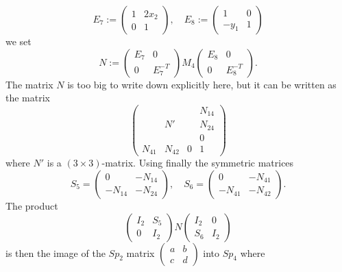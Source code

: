 \documentclass[11pt,leqno]{article}
\newcommand{\jean}[1]{\textcolor{blue}{#1}} %
\renewcommand{\1}{{\rm 1\hspace*{-0.4ex}%
\rule{0.1ex}{1.52ex}\hspace*{0.2ex}}}
\newcommand{\<}[1]{{\langle}#1 {\rangle}}
\theoremstyle{plain}
\theoremstyle{definition}
\theoremstyle{remark}
\numberwithin{equation}{section}
\begin{document}
\begin{equation*}
    E_7 := \begin{pmatrix}
        1  & 2x_2 \\ 0 & 1 
    \end{pmatrix}, \quad E_8 := \begin{pmatrix}
        1 & 0 \\ -y_1 & 1
    \end{pmatrix}
\end{equation*}
we set 
\begin{equation*}
    N := \begin{pmatrix}
        E_7 & 0 \\ 0 & E_7^{-T}
    \end{pmatrix}
    M_4\begin{pmatrix}
        E_8& 0 \\ 0 & E_8^{-T}
    \end{pmatrix} .
\end{equation*}
The matrix $N$ is too big to write down explicitly here, but it can be written as the matrix
\begin{equation*}
    \begin{pmatrix}
        & & & N_{14} \\
        & N'& & N_{24} \\
        & & & 0 \\
        N_{41} & N_{42} & 0 & 1
    \end{pmatrix}
\end{equation*}
where $N'$ is a $(3 \times 3)$-matrix. 
Using finally the symmetric matrices 
\begin{equation*}
    S_5 = \begin{pmatrix}
        0 & -N_{14} \\ -  N_{14} & -N_{24}
    \end{pmatrix},\quad S_6 = \begin{pmatrix}
        0 & -N_{41} \\ -  N_{41} & -N_{42}
    \end{pmatrix} .
\end{equation*} 
The product 
\begin{equation*}
    \begin{pmatrix}
        I_2 & S_5 \\ 0 & I_2
    \end{pmatrix}N \begin{pmatrix}
        I_2 & 0 \\ S_6 & I_2
    \end{pmatrix}
\end{equation*} 
is then the image of the $Sp_2 $ matrix $\begin{pmatrix}
    a & b \\ c & d
\end{pmatrix}$ into $Sp_4$ where 
\end{document}
